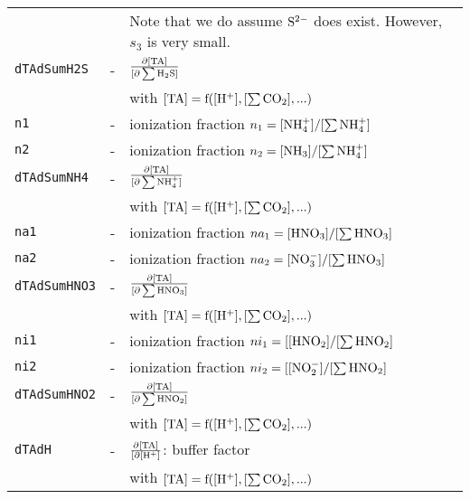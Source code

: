 \documentclass[article,nojss]{jss}
\begin{document}
\begin{footnotesize}
\begin{longtable}{l|l|p{7cm}}
            &                                        & Note that we do assume $\rm S^{2-}$ does exist. However, $s_3$ is very small.\\
\texttt{dTAdSumH2S}   & -                               & $\rm \frac{\partial [TA]}{[\partial \sum H_2S]}$\\
                   &                                  & with $\rm [TA] = f([H^+], [\sum CO_2], ...)$\\     
\texttt{n1}       & -                                & ionization fraction $n_1 = [\rm NH_4^+] / [\rm \sum NH_4^+]$\\
\texttt{n2}       & -                                & ionization fraction $n_2 = [\rm NH_3] / [\rm \sum NH_4^+]$\\
\texttt{dTAdSumNH4}   & -                               & $\rm \frac{\partial [TA]}{[\partial \sum NH_4^+]}$\\
                   &                                  & with $\rm [TA] = f([H^+], [\sum CO_2], ...)$\\     
\texttt{na1}      & -                                 & ionization fraction $na_1 = [\rm HNO_3] / [\sum HNO_3]$\\
\texttt{na2}      & -                                 & ionization fraction $na_2 = [\rm NO_3^-] / [\sum HNO_3]$\\
\texttt{dTAdSumHNO3}   & -                               & $\rm \frac{\partial [TA]}{[\partial \sum HNO_3]}$\\
                   &                                  & with $\rm [TA] = f([H^+], [\sum CO_2], ...)$\\     
\texttt{ni1}       & -                               & ionization fraction $ni_1 = [\rm [HNO_2] / [\rm \sum HNO_2]$\\
\texttt{ni2}       & -                               & ionization fraction $ni_2 = [\rm [NO_2^-] / [\rm \sum HNO_2]$\\
\texttt{dTAdSumHNO2}   & -                               & $\rm \frac{\partial [TA]}{[\partial \sum HNO_2]}$\\
                   &                                  & with $\rm [TA] = f([H^+], [\sum CO_2], ...)$\\         
\texttt{dTAdH}       & -                               & $\rm \frac{\partial [TA]}{[\partial [H^+]}$: buffer factor\\
            &                                 & with $\rm [TA] = f([H^+], [\sum CO_2], ...)$\\        

\end{longtable}
\end{footnotesize}
\end{document}
